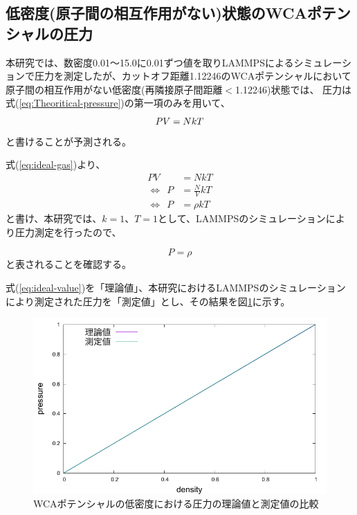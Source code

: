 \documentclass[titlepage]{jsreport}
\begin{document}
{{{\subsection{低密度(原子間の相互作用がない)状態のWCAポテンシャルの圧力}\label{results-sec:WCA-press-low-density}
本研究では、数密度0.01〜15.0に0.01ずつ値を取りLAMMPSによるシミュレーションで圧力を測定したが、カットオフ距離1.12246のWCAポテンシャルにおいて原子間の相互作用がない低密度(再隣接原子間距離$<$1.12246)状態では、
圧力は式(\ref{eq:Theoritical-pressure})の第一項のみを用いて、
\large
\begin{equation}
PV=NkT{\label{eq:ideal-gas}}
\end{equation}
\normalsize
と書けることが予測される。


式(\ref{eq:ideal-gas})より、
\large
\begin{eqnarray}
PV&=NkT\nonumber\\
{\Leftrightarrow}{\ }{\ }P&={\frac{N}{V}}kT\nonumber\\
{\Leftrightarrow}{\ }{\ }P&={\rho}kT\nonumber
\end{eqnarray}
\normalsize
と書け、本研究では、$k=1$、$T=1$として、LAMMPSのシミュレーションにより圧力測定を行ったので、

\large
\begin{equation}
P={\rho} \label{eq:ideal-value}
\end{equation}
\normalsize
と表されることを確認する。

式(\ref{eq:ideal-value})を「理論値」、本研究におけるLAMMPSのシミュレーションにより測定された圧力を「測定値」とし、その結果を図\ref{fig:lowden_compare:den-pre}に示す。

\begin{figure}[htbp]
    \begin{center}
        \includegraphics[width=14cm]{fig/lowden_compare:den-pre.pdf}
    \end{center}
    \caption{WCAポテンシャルの低密度における圧力の理論値と測定値の比較}
    \label{fig:lowden_compare:den-pre}
\end{figure}


}}}
\end{document}
